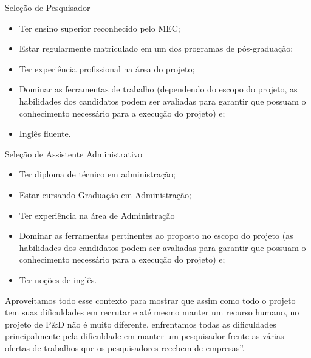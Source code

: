 Seleção de Pesquisador 
\begin{itemize}
  \item Ter ensino superior reconhecido pelo MEC;
  \item Estar regularmente matriculado em um dos programas de pós-graduação;
  \item Ter experiência profissional na área do projeto;
  \item Dominar as ferramentas de trabalho (dependendo do escopo do projeto, as
habilidades dos candidatos podem ser avaliadas para garantir que possuam o
conhecimento necessário para a execução do projeto) e;
  \item Inglês fluente. 
\end{itemize} 

Seleção de Assistente Administrativo
\begin{itemize}
  \item Ter diploma de técnico em administração;
  \item Estar cursando Graduação em Administração;
  \item Ter experiência na área de Administração
  \item Dominar as ferramentas pertinentes ao proposto no escopo do projeto (as
habilidades dos candidatos podem ser avaliadas para garantir que possuam o
conhecimento necessário para a execução do projeto) e;
  \item Ter noções de inglês.
\end{itemize}

Aproveitamos todo esse contexto para mostrar que assim como todo o projeto tem
suas dificuldades em recrutar e até mesmo manter um recurso humano, no projeto
de P\&D não é muito diferente, enfrentamos todas as dificuldades principalmente
pela dificuldade em manter um pesquisador frente as várias ofertas de trabalhos
que os pesquisadores recebem de empresas''.

